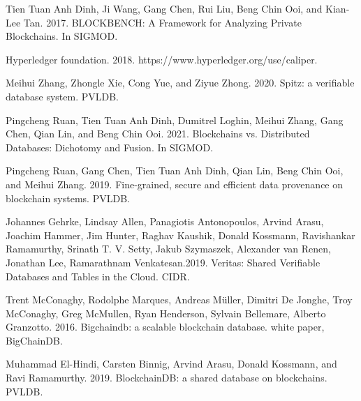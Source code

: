 \documentclass[11pt,dvipdfm]{article}
\begin{document}
\begin{thebibliography}{10}
\begin{small}
 Tien Tuan Anh Dinh, Ji Wang, Gang Chen, Rui Liu, Beng Chin Ooi, and Kian-Lee Tan. 2017. BLOCKBENCH: A Framework for Analyzing Private Blockchains. In SIGMOD.





 Hyperledger foundation. 2018. https://www.hyperledger.org/use/caliper.

 Meihui Zhang, Zhongle Xie, Cong Yue, and Ziyue Zhong. 2020. Spitz: a verifiable database system. PVLDB.

 Pingcheng Ruan, Tien Tuan Anh Dinh, Dumitrel Loghin, Meihui Zhang, Gang Chen, Qian Lin, and Beng Chin Ooi. 2021. Blockchains vs. Distributed Databases: Dichotomy and Fusion. In SIGMOD.

 Pingcheng Ruan, Gang Chen, Tien Tuan Anh Dinh, Qian Lin, Beng Chin Ooi, and Meihui Zhang. 2019. Fine-grained, secure and efficient data provenance on blockchain systems. PVLDB.

 Johannes Gehrke, Lindsay Allen, Panagiotis Antonopoulos, Arvind Arasu, Joachim Hammer, Jim Hunter, Raghav Kaushik, Donald Kossmann, Ravishankar Ramamurthy, Srinath T. V. Setty, Jakub Szymaszek, Alexander van Renen, Jonathan Lee, Ramarathnam Venkatesan.2019. Veritas: Shared Verifiable Databases and Tables in the Cloud. CIDR.

 Trent McConaghy, Rodolphe Marques, Andreas Müller, Dimitri De Jonghe, Troy McConaghy, Greg McMullen, Ryan Henderson, Sylvain Bellemare, Alberto Granzotto. 2016. Bigchaindb: a scalable blockchain database. white paper, BigChainDB.

 Muhammad El-Hindi, Carsten Binnig, Arvind Arasu, Donald Kossmann, and Ravi Ramamurthy. 2019. BlockchainDB: a shared database on blockchains. PVLDB.


\end{small}
\end{thebibliography}
\end{document}
